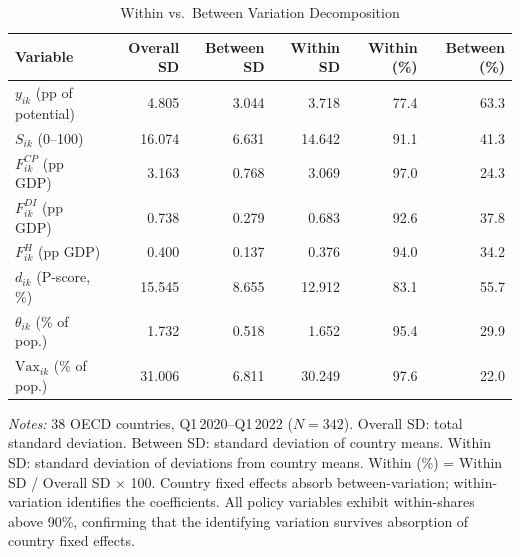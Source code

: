 \documentclass[12pt, a4paper]{article}
\begin{document}
\begin{table}[H]
\centering
\caption{Within vs.\ Between Variation Decomposition}
\label{tab:within_between}
\small
\renewcommand{\arraystretch}{1.15}
\begin{tabular}{@{} l r r r r r @{}}
\toprule
\textbf{Variable} & \textbf{Overall SD} & \textbf{Between SD} & \textbf{Within SD}
  & \textbf{Within (\%)} & \textbf{Between (\%)} \\
\midrule
$y_{ik}$ (pp of potential)       & 4.805 & 3.044 & 3.718 & 77.4 & 63.3 \\
$S_{ik}$ (0--100)                & 16.074 & 6.631 & 14.642 & 91.1 & 41.3 \\
$F^{CP}_{ik}$ (pp GDP)          & 3.163 & 0.768 & 3.069 & 97.0 & 24.3 \\
$F^{DI}_{ik}$ (pp GDP)          & 0.738 & 0.279 & 0.683 & 92.6 & 37.8 \\
$F^{H}_{ik}$ (pp GDP)           & 0.400 & 0.137 & 0.376 & 94.0 & 34.2 \\
$d_{ik}$ (P-score, \%)          & 15.545 & 8.655 & 12.912 & 83.1 & 55.7 \\
$\theta_{ik}$ (\% of pop.)      & 1.732 & 0.518 & 1.652 & 95.4 & 29.9 \\
$\text{Vax}_{ik}$ (\% of pop.)  & 31.006 & 6.811 & 30.249 & 97.6 & 22.0 \\
\bottomrule
\end{tabular}
\vspace{4pt}

\parbox{\textwidth}{\footnotesize\textit{Notes:} 38 OECD countries,
Q1\,2020--Q1\,2022 ($N = 342$). Overall SD: total standard deviation.
Between SD: standard deviation of country means. Within SD: standard
deviation of deviations from country means. Within (\%) = Within SD /
Overall SD $\times$ 100. Country fixed effects absorb between-variation;
within-variation identifies the coefficients. All policy variables
exhibit within-shares above 90\%, confirming that the identifying
variation survives absorption of country fixed effects.}
\end{table}
\end{document}
